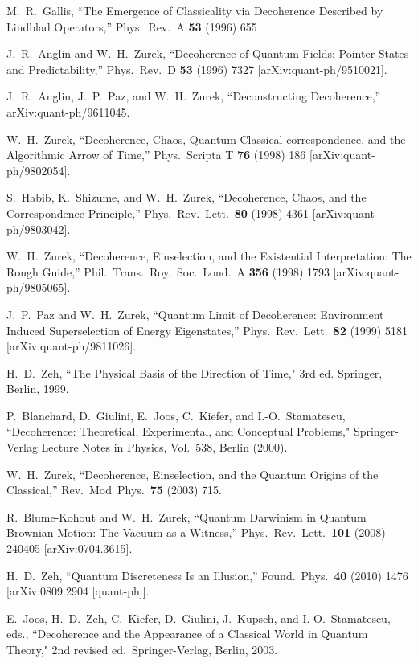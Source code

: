 \documentclass[12pt]{article}
\begin{document}
\begin{thebibliography}{99}
{ M.~R.~Gallis, ``The Emergence of Classicality via
Decoherence Described by Lindblad Operators,'' Phys.\ Rev.\ A {\bf 53}
 (1996) 655

 J.~R.~Anglin and W.~H.~Zurek, ``Decoherence of Quantum
Fields: Pointer States and Predictability,'' Phys.\ Rev.\ D {\bf 53}
 (1996) 7327 [arXiv:quant-ph/9510021].

 J.~R.~Anglin, J.~P.~Paz, and W.~H.~Zurek, ``Deconstructing
Decoherence,'' arXiv:quant-ph/9611045.

 W.~H.~Zurek, ``Decoherence, Chaos, Quantum Classical
correspondence, and the Algorithmic Arrow of Time,'' Phys.\ Scripta T
{\bf 76} (1998) 186 [arXiv:quant-ph/9802054].

 S.~Habib, K.~Shizume, and W.~H.~Zurek, ``Decoherence,
Chaos, and the Correspondence Principle,'' Phys.\ Rev.\ Lett.\ {\bf 80}
(1998) 4361 [arXiv:quant-ph/9803042].

 W.~H.~Zurek, ``Decoherence, Einselection, and the
Existential Interpretation: The Rough Guide,'' Phil.\ Trans.\ Roy.\
Soc.\ Lond.\ A {\bf 356} (1998) 1793 [arXiv:quant-ph/9805065].

 J.~P.~Paz and W.~H.~Zurek, ``Quantum Limit of Decoherence:
Environment Induced Superselection of Energy Eigenstates,'' Phys.\ Rev.\
Lett.\ {\bf 82} (1999) 5181 [arXiv:quant-ph/9811026].

 H.~D.~Zeh, ``The Physical Basis of the Direction of
Time," 3rd ed. Springer, Berlin, 1999.

 P.~Blanchard, D.~Giulini, E.~Joos, C.~Kiefer, and
I.-O.~Stamatescu, ``Decoherence: Theoretical, Experimental, and
Conceptual Problems," Springer-Verlag Lecture Notes in Physics, Vol.\
538, Berlin (2000).

\bibitem{Zurek03} W.~H.~Zurek, ``Decoherence, Einselection, and the
Quantum Origins of the Classical,'' Rev.\ Mod\ Phys.\ {\bf 75}
(2003) 715.


 R.~Blume-Kohout and W.~H.~Zurek, ``Quantum Darwinism in
Quantum Brownian Motion: The Vacuum as a Witness,'' Phys.\ Rev.\
Lett.\ {\bf 101}  (2008) 240405 [arXiv:0704.3615].

\bibitem{Zeh10} H.~D.~Zeh, ``Quantum Discreteness Is an Illusion,''
Found.\ Phys.\ {\bf 40}  (2010) 1476 [arXiv:0809.2904 [quant-ph]].

 
\bibitem{JZKGKS} E.~Joos, H.~D.~Zeh, C.~Kiefer, D.~Giulini, J.~Kupsch,
and I.-O.~Stamatescu, eds., ``Decoherence and the Appearance of a
Classical World in Quantum Theory," 2nd revised ed.\ Springer-Verlag,
Berlin, 2003.
  
}
\end{thebibliography}
\end{document}
